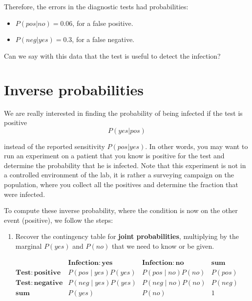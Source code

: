 \documentclass[
]{book}
\providecommand{\tightlist}{%
  \setlength{\itemsep}{0pt}\setlength{\parskip}{0pt}}
\begin{document}
Therefore, the errors in the diagnostic tests had probabilities:

\begin{itemize}
\tightlist
\item
  \(P(pos| no)= 0.06\), for a false positive.
\item
  \(P(neg| yes)= 0.3\), for a false negative.
\end{itemize}

Can we say with this data that the test is useful to detect the infection?

\hypertarget{inverse-probabilities}{%
\section{Inverse probabilities}\label{inverse-probabilities}}

We are really interested in finding the probability of being infected if the test is positive \[P(yes| pos)\]

instead of the reported sensitivity \(P(pos|yes)\). In other words, you may want to run an experiment on a patient that you know is positive for the test and determine the probability that he is infected. Note that this experiment is not in a controlled environment of the lab, it is rather a surveying campaign on the population, where you collect all the positives and determine the fraction that were infected.

To compute these inverse probability, where the condition is now on the other event (positive), we follow the steps:

\begin{enumerate}
\def\labelenumi{\arabic{enumi}.}
\tightlist
\item
  Recover the contingency table for \textbf{joint probabilities}, multiplying by the marginal \(P(yes)\) and \(P(no)\) that we need to know or be given.
\end{enumerate}

\[
\begin{array}{ccc|c}
 & \mathbf{Infection: yes} & \mathbf{Infection: no} & \mathbf{sum} \\
\mathbf{Test: positive} & P(pos \mid yes)P(yes) & P(pos \mid no)P(no) & P(pos) \\
\mathbf{Test: negative} & P(neg \mid yes)P(yes) & P(neg \mid no)P(no) & P(neg) \\ \hline
\mathbf{sum} & P(yes) & P(no) & 1 \\
\end{array}
\]
\end{document}
